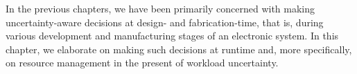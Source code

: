 In the previous chapters, we have been primarily concerned with making
uncertainty-aware decisions at design- and fabrication-time, that is, during
various development and manufacturing stages of an electronic system. In this
chapter, we elaborate on making such decisions at runtime and, more
specifically, on resource management in the present of workload uncertainty.

\section{\introductiontitle}

\section{\problemtitle}

\section{\priortitle}

\section{\solutiontitle}

\section{\resultstitle}

\section{\conclusiontitle}
